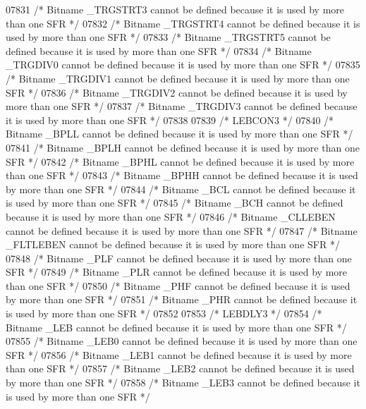 \begin{DoxyCode}
07831 \textcolor{comment}{/* Bitname \_TRGSTRT3 cannot be defined because it is used by more than one SFR */}
07832 \textcolor{comment}{/* Bitname \_TRGSTRT4 cannot be defined because it is used by more than one SFR */}
07833 \textcolor{comment}{/* Bitname \_TRGSTRT5 cannot be defined because it is used by more than one SFR */}
07834 \textcolor{comment}{/* Bitname \_TRGDIV0 cannot be defined because it is used by more than one SFR */}
07835 \textcolor{comment}{/* Bitname \_TRGDIV1 cannot be defined because it is used by more than one SFR */}
07836 \textcolor{comment}{/* Bitname \_TRGDIV2 cannot be defined because it is used by more than one SFR */}
07837 \textcolor{comment}{/* Bitname \_TRGDIV3 cannot be defined because it is used by more than one SFR */}
07838 
07839 \textcolor{comment}{/* LEBCON3 */}
07840 \textcolor{comment}{/* Bitname \_BPLL cannot be defined because it is used by more than one SFR */}
07841 \textcolor{comment}{/* Bitname \_BPLH cannot be defined because it is used by more than one SFR */}
07842 \textcolor{comment}{/* Bitname \_BPHL cannot be defined because it is used by more than one SFR */}
07843 \textcolor{comment}{/* Bitname \_BPHH cannot be defined because it is used by more than one SFR */}
07844 \textcolor{comment}{/* Bitname \_BCL cannot be defined because it is used by more than one SFR */}
07845 \textcolor{comment}{/* Bitname \_BCH cannot be defined because it is used by more than one SFR */}
07846 \textcolor{comment}{/* Bitname \_CLLEBEN cannot be defined because it is used by more than one SFR */}
07847 \textcolor{comment}{/* Bitname \_FLTLEBEN cannot be defined because it is used by more than one SFR */}
07848 \textcolor{comment}{/* Bitname \_PLF cannot be defined because it is used by more than one SFR */}
07849 \textcolor{comment}{/* Bitname \_PLR cannot be defined because it is used by more than one SFR */}
07850 \textcolor{comment}{/* Bitname \_PHF cannot be defined because it is used by more than one SFR */}
07851 \textcolor{comment}{/* Bitname \_PHR cannot be defined because it is used by more than one SFR */}
07852 
07853 \textcolor{comment}{/* LEBDLY3 */}
07854 \textcolor{comment}{/* Bitname \_LEB cannot be defined because it is used by more than one SFR */}
07855 \textcolor{comment}{/* Bitname \_LEB0 cannot be defined because it is used by more than one SFR */}
07856 \textcolor{comment}{/* Bitname \_LEB1 cannot be defined because it is used by more than one SFR */}
07857 \textcolor{comment}{/* Bitname \_LEB2 cannot be defined because it is used by more than one SFR */}
07858 \textcolor{comment}{/* Bitname \_LEB3 cannot be defined because it is used by more than one SFR */}

\end{DoxyCode}
